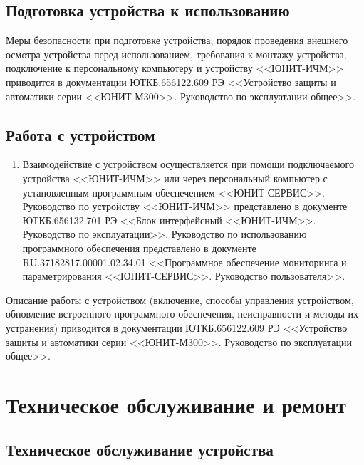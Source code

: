 \documentclass[a4paper, 12pt,table, hidelinks, DIV=calc]{extarticle} %
\begin{document}
\color{uniblue}\subsection{Подготовка устройства к использованию}\color{black}
Меры безопасности при подготовке устройства, порядок проведения внешнего осмотра устройства перед использованием, требования к монтажу устройства, подключение к персональному компьютеру и устройству <<ЮНИТ-ИЧМ>> приводится в документации ЮТКБ.656122.609 РЭ <<Устройство защиты и автоматики серии <<ЮНИТ-М300>>. Руководство по эксплуатации общее>>.

\color{uniblue}\subsection{Работа с устройством}\color{black}

\begin{enumerate}[label=\arabic{section}.\arabic{subsection}.\arabic*, labelsep=4pt, leftmargin=0pt, itemindent=57pt]
    \item
    Взаимодействие с устройством осуществляется при помощи подключаемого устройства <<ЮНИТ-ИЧМ>> или через персональный компьютер с установленным программным обеспечением <<ЮНИТ-СЕРВИС>>. Руководство по устройству <<ЮНИТ-ИЧМ>> представлено в документе ЮТКБ.656132.701 РЭ <<Блок интерфейсный <<ЮНИТ-ИЧМ>>. Руководство по эксплуатации>>. Руководство по использованию программного обеспечения представлено в документе RU.37182817.00001.02.34.01 <<Программное обеспечение мониторинга и параметрирования <<ЮНИТ-СЕРВИС>>. Руководство пользователя>>.
    
    
    \end{enumerate}
    
    \par
    Описание работы с устройством (включение, способы управления устройством, обновление встроенного программного обеспечения, неисправности и методы их устранения) приводится в документации ЮТКБ.656122.609 РЭ <<Устройство защиты и автоматики серии <<ЮНИТ-М300>>. Руководство по эксплуатации общее>>.\newpage
\color{uniblue}\section[Техническое обслуживание и ремонт]{Техническое обслуживание и ремонт}\label{sec:techrepair}
\color{black}

\color{uniblue}\subsection{Техническое обслуживание устройства}\color{black}
\end{document}

